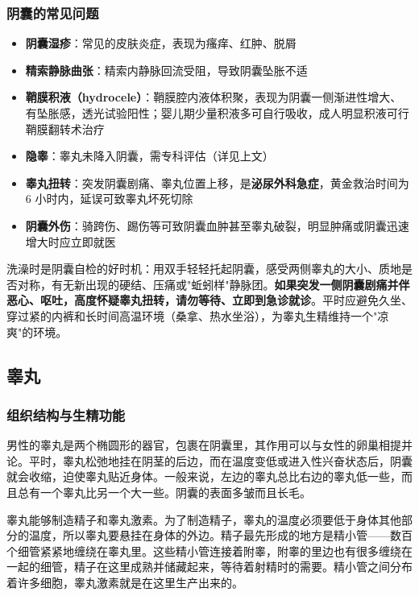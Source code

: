 \subsubsection{阴囊的常见问题}

\begin{itemize}
    \item \textbf{阴囊湿疹}：常见的皮肤炎症，表现为瘙痒、红肿、脱屑
    \item \textbf{精索静脉曲张}：精索内静脉回流受阻，导致阴囊坠胀不适
    \item \textbf{鞘膜积液（hydrocele）}：鞘膜腔内液体积聚，表现为阴囊一侧渐进性增大、有坠胀感，透光试验阳性；婴儿期少量积液多可自行吸收，成人明显积液可行鞘膜翻转术治疗
    \item \textbf{隐睾}：睾丸未降入阴囊，需专科评估（详见上文）
    \item \textbf{睾丸扭转}：突发阴囊剧痛、睾丸位置上移，是\textbf{泌尿外科急症}，黄金救治时间为 $6$ 小时内，延误可致睾丸坏死切除
    \item \textbf{阴囊外伤}：骑跨伤、踢伤等可致阴囊血肿甚至睾丸破裂，明显肿痛或阴囊迅速增大时应立即就医
\end{itemize}

\begin{tcolorbox}[colback=pink!5!white,colframe=red!50!black,title=贴心小叮咛]
洗澡时是阴囊自检的好时机：用双手轻轻托起阴囊，感受两侧睾丸的大小、质地是否对称，有无新出现的硬结、压痛或"蚯蚓样"静脉团。\textbf{如果突发一侧阴囊剧痛并伴恶心、呕吐，高度怀疑睾丸扭转，请勿等待、立即到急诊就诊}。平时应避免久坐、穿过紧的内裤和长时间高温环境（桑拿、热水坐浴），为睾丸生精维持一个"凉爽"的环境。
\end{tcolorbox}

\subsection{睾丸}
\subsubsection{组织结构与生精功能}

男性的睾丸是两个椭圆形的器官，包裹在阴囊里，其作用可以与女性的卵巢相提并论。平时，睾丸松弛地挂在阴茎的后边，而在温度变低或进入性兴奋状态后，阴囊就会收缩，迫使睾丸贴近身体。一般来说，左边的睾丸总比右边的睾丸低一些，而且总有一个睾丸比另一个大一些。阴囊的表面多皱而且长毛。

睾丸能够制造精子和睾丸激素。为了制造精子，睾丸的温度必须要低于身体其他部分的温度，所以睾丸要悬挂在身体的外边。精子最先形成的地方是精小管——数百个细管紧紧地缠绕在睾丸里。这些精小管连接着附睾，附睾的里边也有很多缠绕在一起的细管，精子在这里成熟并储藏起来，等待着射精时的需要。精小管之间分布着许多细胞，睾丸激素就是在这里生产出来的。

